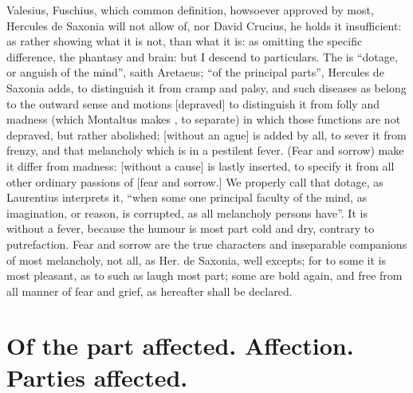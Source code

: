 Valesius,  Fuschius,
 \etc{} which common
definition, howsoever approved by most, Hercules de
Saxonia will not allow of, nor David Crucius,  he holds it insufficient: as
rather showing what it is not, than what it is: as
omitting the specific difference, the phantasy and brain: but I descend to
particulars. The  is \enquote{dotage, or anguish of the mind}, saith
Aretaeus; \enquote{of the principal parts}, Hercules de Saxonia adds, to distinguish it
from cramp and palsy, and such diseases as belong to the outward sense and
motions [depraved] to distinguish it from folly and
madness (which Montaltus makes , to separate) in which those
functions are not depraved, but rather abolished; [without an ague] is added by
all, to sever it from frenzy, and that melancholy which is in a pestilent
fever. (Fear and sorrow) make it differ from madness: [without a cause] is
lastly inserted, to specify it from all other ordinary passions of [fear and
sorrow.] We properly call that dotage, as Laurentius
interprets it, \enquote{when some one principal faculty of the mind, as imagination, or
reason, is corrupted, as all melancholy persons have}. It is without a fever,
because the humour is most part cold and dry, contrary to putrefaction. Fear
and sorrow are the true characters and inseparable companions of most
melancholy, not all, as Her. de Saxonia,  well excepts; for to some it is most
pleasant, as to such as laugh most part; some are bold again, and free from all
manner of fear and grief, as hereafter shall be declared.

\section{Of the part affected. Affection. Parties affected.}\label{sec:parts-affected}

